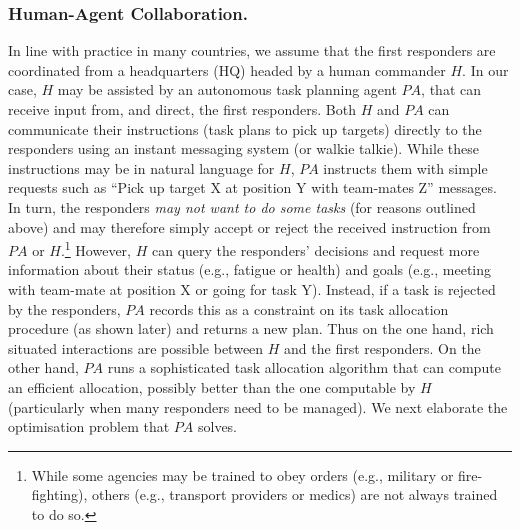 %
\subsubsection{Human-Agent Collaboration.}
\noindent In line with practice in many countries, we assume that the first responders are coordinated from a headquarters (HQ) headed by a human commander $H$. In our case, $H$ may be assisted by an autonomous task planning agent $PA$, that can receive input from, and direct, the first responders.   Both  $H$ and $PA$  can communicate their  instructions (task plans to pick up targets) directly to the responders using an instant messaging system (or walkie talkie).  While these instructions may be in natural language for $H$, $PA$ instructs them with simple requests such as ``Pick up target X at position Y with team-mates Z'' messages. In turn, the responders \emph{may not want to do some tasks} (for reasons outlined above) and may therefore simply accept or reject the received instruction from $PA$ or $H$.\footnote{While some agencies may be trained to obey orders (e.g., military or fire-fighting), others (e.g., transport providers or medics) are not always trained to do so.} However, $H$ can query the responders' decisions and request  more information about their status (e.g., fatigue or health) and goals (e.g., meeting with team-mate at position X or going for task Y). Instead, if a task is rejected by the responders, $PA$ records this as a constraint on its task allocation procedure (as shown later) and returns a new plan. Thus on the one hand, rich situated interactions are possible between $H$ and the first responders. On the other hand, $PA$ runs a sophisticated task allocation algorithm that can compute an efficient allocation, possibly better than the one computable by $H$ (particularly when many responders need to be managed). We next elaborate the optimisation problem that $PA$ solves.



